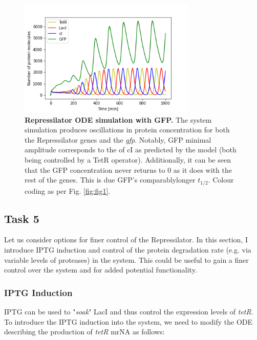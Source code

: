 \documentclass[runningheads,a4paper]{llncs}
\begin{document}
\vspace{-2.2\abovedisplayskip}
\begin{figure}[H]
    \singlespacing
    \centering
    \includegraphics[width=0.75\textwidth,trim={0 0.1cm 0 1.2cm},clip]{suplementary_information_and_code/Task4_figure1.png}
    \caption{\textbf{Repressilator ODE simulation with GFP.} The system simulation produces oscillations in protein concentration for both the Repressilator genes and the \textit{gfp}. Notably, GFP minimal amplitude corresponds to the of cI as predicted by the model (both being controlled by a TetR operator). Additionally, it can be seen that the GFP concentration never returns to 0 as it does with the rest of the genes. This is due GFP's comparably\linebreak longer $t_{1/2}$. Colour coding as per Fig. \ref{fig:fig1}.}
    \label{fig:fig12}
\end{figure}

\subsection*{Task 5}
Let us consider options for finer control of the Repressilator. In this section, I introduce IPTG induction and control of the protein degradation rate (e.g. via variable levels of proteases) in the system. This could be useful to gain a finer control over the system and for added potential functionality. 

\subsubsection*{IPTG Induction}
IPTG can be used to "\textit{soak}" LacI and thus control the expression levels of \textit{tetR}. To introduce the IPTG induction into the system, we need to modify the ODE describing the production of \textit{tetR} mrNA as follows:
\end{document}
